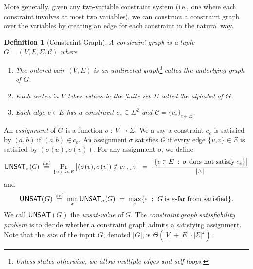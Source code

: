 \documentclass{article}
\newtheorem{definition}[theorem]{Definition}
\newcommand{\class}[1]{\mathbf{#1}}
\newcommand{\NP}{\class{NP}}
\newcommand{\UNSAT}{\mathsf{UNSAT}}
\newcommand{\eqdef}{\mathbin{\stackrel{\rm def}{=}}}
\begin{document}
More generally, given any two-variable constraint system (i.e., one where each
constraint involves at most two variables), we can construct a constraint graph
over the variables by creating an edge for each constraint in the natural way.



\begin{definition}[Constraint Graph] A constraint graph is a tuple
$G = (V, E, \Sigma, \mathcal{C})$ where
\begin{enumerate}
\item The ordered pair $(V, E)$ is an undirected graph\footnote{Unless stated otherwise, we allow multiple edges and self-loops.} called the underlying
  graph of $G$.
\item Each vertex in $V$ takes values in the finite set $\Sigma$
  called the alphabet of $G$.
\item Each edge $e \in E$ has a constraint $c_e \subseteq \Sigma^2$ and
  $\mathcal{C} = \{c_e\}_{e \in E}$.
\end{enumerate}
\end{definition}

An \emph{assignment} of $G$ is a function $\sigma \;:\: V \to \Sigma$.
We a say a constraint $c_e$ is satisfied by $(a, b)$ if $(a, b) \in c_e$. 
An assignment $\sigma$ satisfies $G$ if every edge $\{u, v\} \in E$
is satisfied by $(\sigma(u), \sigma(v))$.
For any assignment $\sigma$, we define
\begin{align*}
\UNSAT_\sigma(G) \;\eqdef\; \Pr_{\{u, v\} \in E} \big[(\sigma(u), \sigma(v)) \notin c_{\{u, v\}}\big] 
  \;=\; \frac{\big|\{e \in E \;:\; \sigma \text{ does not satisfy } c_e\}\big|}{|E|}
\end{align*}
and
\begin{align*}
\UNSAT(G) \;\eqdef\; \min_\sigma \UNSAT_\sigma(G)
  \;=\; \max_\varepsilon \{\varepsilon \;:\; G \text{ is } \varepsilon\text{-far from satisfied} \}.
\end{align*}
We call $\UNSAT(G)$ the \emph{unsat-value} of $G$.
The \emph{constraint graph satisfiability problem} is to decide whether
a constraint graph admits a satisfying assignment.
Note that the \emph{size} of the input $G$, denoted $|G|$, is $\Theta(|V|+|E|\cdot|\Sigma|^2)$.
\end{document}
